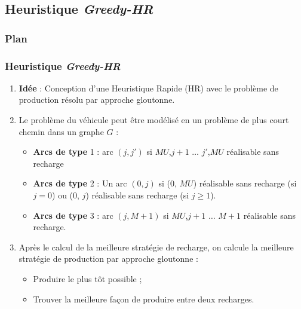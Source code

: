 \documentclass[hyperref={bookmarks=false},aspectratio=169]{beamer}
\begin{document}
\subsection{Heuristique \textbf{\textit{Greedy-HR}}}%
\begin{frame}
\frametitle{Plan}
\addtocounter{framenumber}{-1}
\end{frame}
\begin{frame}
\frametitle{Heuristique \textbf{\textit{Greedy-HR}}}
\begin{enumerate}
\item<1-> \textbf{Idée} : Conception d'une Heuristique Rapide (HR) avec le problème de production résolu par approche gloutonne.
\item<2-> Le problème du véhicule peut être modélisé en un problème de plus court chemin dans un graphe $G$ :
\begin{itemize}
	\item \textbf{Arcs de type} 1 : arc $(j,j' )$ si $MU$,$j+1$ $\dots$ $j'$,$MU$ réalisable sans recharge %
	\item \textbf{Arcs de type} 2 : Un arc $(0,j)$ si
	 ($0$, $MU$) réalisable sans recharge (si $j=0$) %
		ou  ($0$, $j$) réalisable sans recharge (si $j\geq1$). %
	
	\item \textbf{Arcs de type} 3 : arc $(j,M+1) $ si $MU$,$j+1$ $\dots$ $M+1$ réalisable sans recharge.%
\end{itemize}
\item<3-> Après le calcul de la meilleure stratégie de recharge, on calcule la meilleure stratégie de production par approche gloutonne :
\begin{itemize}
	\item Produire le plus tôt possible ;%
		\item Trouver la meilleure façon de produire entre deux recharges.%
	\end{itemize}
 \end{enumerate}
\end{frame}
\end{document}
